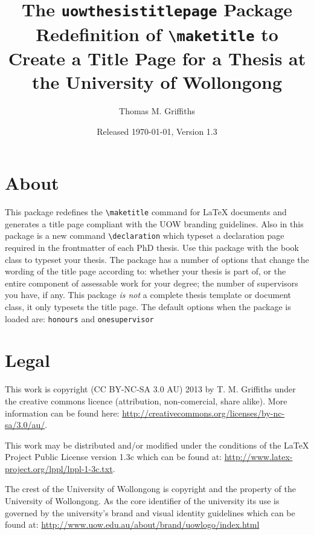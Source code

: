 \documentclass[12pt,oneside]{article}
\newcommand{\oporcom}[1]{\texttt{\color{Red}#1}} %
\begin{document}
    
\title{\textsf{The \texttt{uowthesistitlepage} Package\\
Redefinition of \texttt{\textbackslash{}maketitle} to Create a Title Page for a Thesis at the University of Wollongong}}
\author{Thomas M. Griffiths}
\date{Released \today, Version 1.3}

\maketitle

\tableofcontents

\section{About}
This package redefines the \oporcom{\textbackslash{}maketitle} command for LaTeX documents and generates a title page compliant with the UOW branding guidelines. Also in this package is a new command \oporcom{\textbackslash{}declaration} which typeset a declaration page required in the frontmatter of each PhD thesis. Use this package with the book class to typeset your thesis. The package has a number of options that change the wording of the title page according to: whether your thesis is part of, or the entire component of assessable work for your degree; the number of supervisors you have, if any. This package \emph{is not} a complete thesis template or document class, it only typesets the title page. The default options when the package is loaded are: \oporcom{honours} and \oporcom{onesupervisor}

\section{Legal}
This work is copyright (CC BY-NC-SA 3.0 AU) 2013 by T. M. Griffiths under the creative commons licence (attribution, non-comercial, share alike). More information can be found here: \url{http://creativecommons.org/licenses/by-nc-sa/3.0/au/}. 

This work may be distributed and/or modified under the conditions of the LaTeX Project Public License version 1.3c which can be found at: \url{http://www.latex-project.org/lppl/lppl-1-3c.txt}.

The crest of the University of Wollongong is copyright and the property of the University of Wollongong. As the core identifier of the university its use is governed by the university's brand and visual identity guidelines which can be found at: \url{http://www.uow.edu.au/about/brand/uowlogo/index.html}
\end{document}
